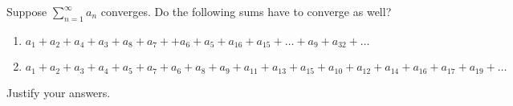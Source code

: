 \documentclass{article}
\begin{document}
\setlength{\parindent}{0pt}
Suppose $\sum_{n=1}^\infty a_n$ converges.
Do the following sums have to converge as well?
\begin{enumerate}[label=\alph*)]
\item$ a_1+a_2+a_4+a_3+a_8+a_7++a_6+a_5+a_{16}+a_{15}+\dots +a_9 + a_{32} +\dots$
\item $a_1+a_2+a_3+a_4+a_5+a_7+a_6+a_8+a_9+a_{11}+a_{13}+a_{15}+a_{10}+a_{12}+a_{14}+a_{16}+a_{17}+a_{19}+\dots$
\end{enumerate}
Justify your answers.
\end{document}
